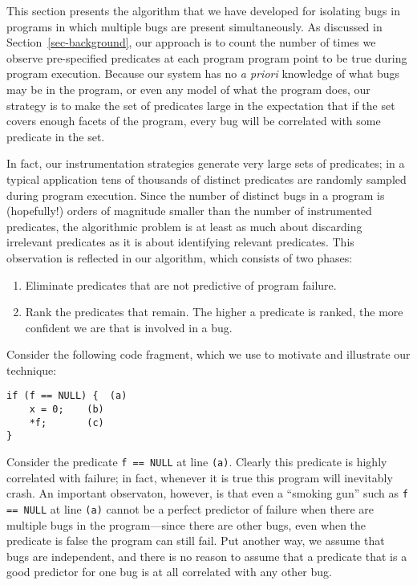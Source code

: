 \newcommand{\prob}{\mbox{\em Prob}}
\newcommand{\fail}{\mbox{\em Fail}}
\newcommand{\crash}{\mbox{\em Crash}}
\newcommand{\context}{\mbox{\em Context}}

This section presents the algorithm that we have developed for
isolating bugs in programs in which multiple bugs are present
simultaneously.  As discussed in Section~\ref{sec-background}, our
approach is to count the number of times we observe pre-specified
predicates at each program program point to be true during program
execution.  Because our system has no {\em a priori} knowledge of what bugs
may be in the program, or even any model of what the program does, our
strategy is to make the set of predicates large in the expectation that
if the set covers enough facets of the program, every bug will be correlated
with some predicate in the set.

In fact, our instrumentation strategies generate very large sets
of predicates; in a typical application tens of thousands of distinct
predicates are randomly sampled during program execution.  Since the
number of distinct bugs in a program is (hopefully!) orders of
magnitude smaller than the number of instrumented predicates, the
algorithmic problem is at least as much about discarding irrelevant
predicates as it is about identifying relevant predicates.  This
observation is reflected in our algorithm, which consists of two phases:
\begin{enumerate}
\item Eliminate predicates that are not predictive of program failure.

\item Rank the predicates that remain.  The higher a predicate is ranked,
the more confident we are that is involved in a bug.
\end{enumerate}

Consider the following code fragment, which we use to motivate and illustrate
our technique:
\begin{verbatim}
if (f == NULL) {  (a)
	x = 0;    (b)
	*f;       (c)
}
\end{verbatim}
Consider the predicate {\tt f == NULL} at line {\tt (a)}.  Clearly
this predicate is highly correlated with failure; in fact, whenever it
is true this program will inevitably crash.  An important observaton,
however, is that even a ``smoking gun'' such as {\tt f == NULL} at
line {\tt (a)} cannot be a perfect predictor of failure when there are
multiple bugs in the program---since there are other bugs, even when
the predicate is false the program can still fail.  Put another way, we assume
that bugs are independent, and there is no reason to assume that
a predicate that is a good predictor for one bug is at all correlated
with any other bug.

